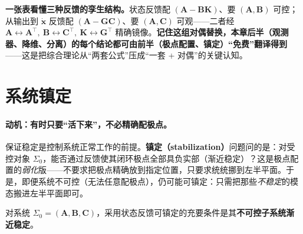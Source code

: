 \begin{insight}
\textbf{一张表看懂三种反馈的孪生结构。}\;状态反馈配 $(\mathbf A-\mathbf B\mathbf K)$、要 $(\mathbf A,\mathbf B)$ 可控；从输出到 $\dot{\mathbf x}$ 反馈配 $(\mathbf A-\mathbf G\mathbf C)$、要 $(\mathbf A,\mathbf C)$ 可观——二者经 $\mathbf A\leftrightarrow\mathbf A^\top,\ \mathbf B\leftrightarrow\mathbf C^\top,\ \mathbf K\leftrightarrow\mathbf G^\top$ 精确镜像。\textbf{记住这组对偶替换，本章后半（观测器、降维、分离）的每个结论都可由前半（极点配置、镇定）“免费”翻译得到}——这是把综合理论从“两套公式”压成“一套 + 对偶”的关键认知。
\end{insight}

\section{系统镇定}
\label{sec:syn-stabilize}

\paragraph{动机：有时只要“活下来”，不必精确配极点。}
保证稳定是控制系统正常工作的前提。\textbf{镇定（stabilization）}问题问的是：对受控对象 $\Sigma_0$，能否通过反馈使其闭环极点全部具负实部（渐近稳定）？这是极点配置的\emph{弱化}版——不要求把极点精确放到指定位置，只要求统统挪到左半平面。于是，即便系统不可控（无法任意配极点），仍可能可镇定：只需把那些\emph{不稳定}的模态搬进左半平面即可。

\begin{theorem}[状态反馈可镇定的充要条件]
\label{thm:syn-stabilize}
对系统 $\Sigma_0=(\mathbf A,\mathbf B,\mathbf C)$，采用状态反馈可镇定的充要条件是其\textbf{不可控子系统渐近稳定}\cite{liubao2006modern,zhang2017modern}。
\end{theorem}

